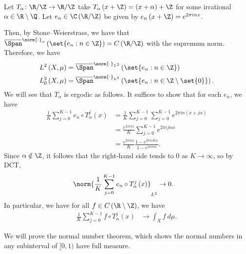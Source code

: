 \documentclass[10pt]{mypackage}
\begin{document}
\begin{example}
  Let $T_{\alpha}\colon \R/\Z\to \R/\Z$ take $T_{\alpha}\left( x + \Z \right) = \left( x + \alpha \right) + \Z$ for some irrational $\alpha\in \R\setminus \Q$. Let $e_n\in \C\left( \R/\Z \right)$ be given by $e_n\left( x + \Z \right) = e^{2\pi i n x}$.

  Then, by Stone--Weierstrass, we have that $ \overline{\Span}^{\norm{\cdot}_u}\left( \set{e_n : n\in \Z} \right) = C\left( \R/\Z \right) $ with the supremum norm. Therefore, we have
  \begin{align*}
    L^2\left( X,\mu \right) &= \overline{\Span}^{\norm{\cdot}_{L^2}}\left( \set{e_n : n\in \Z} \right)\\
    L^2_0\left( X,\mu \right) &= \overline{\Span}^{\norm{\cdot}_{L^2}} \left( \set{e_n : n\in \Z\setminus \set{0}} \right).
  \end{align*}
  We will see that $T_{\alpha}$ is ergodic as follows. It suffices to show that for each $e_n$, we have
  \begin{align*}
    \frac{1}{K} \sum_{j=0}^{K-1} e_n\circ T^{j}_{\alpha}\left( x \right) &= \frac{1}{K}\sum_{j=0}^{K-1} \sum_{j=0}^{K-1} e^{2\pi i n \left( x + j\alpha \right)}\\
                                                                         &= \frac{e^{2\pi i n x}}{K} \sum_{j=0}^{K-1} e^{2\pi i j n \alpha}\\
                                                                         &= \frac{e^{2\pi i n x}}{K} \frac{1-e^{2\pi i n K \alpha}}{1 - e^{2\pi i n \alpha}}.
  \end{align*}
  Since $\alpha\notin \Z$, it follows that the right-hand side tends to $0$ as $K\rightarrow\infty$, so by DCT,
  \begin{align*}
    \norm{\frac{1}{K}\sum_{j=0}^{K-1}e_n\circ T^j_{\alpha}\left( x \right)}_{L^2} &\to 0.
  \end{align*}
  In particular, we have for all $f\in C\left( \R\setminus \Z \right)$, we have
  \begin{align*}
    \frac{1}{K}\sum_{j=0}^{K-1} f\circ T^j_{\alpha}\left( x \right) &\to \int_{X}^{} f\:d\mu.
  \end{align*}

  We will prove the normal number theorem, which shows the normal numbers in any subinterval of $[0,1)$ have full measure.


\end{example}
\end{document}
